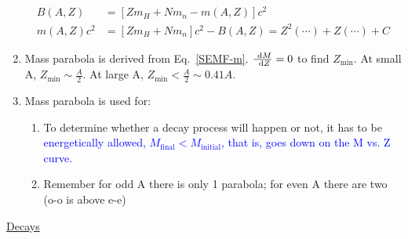\documentclass{school-22.101-notes}
\begin{document}
\begin{enumerate}
\begin{align}
B(A,Z) &= \left[ Z m_H + N m_n - m(A,Z) \right] c^2  \label{BAZ}\\
m(A,Z) c^2 &= \left[ Z m_H + N m_n \right] c^2 - B(A,Z) = Z^2 (\cdots) + Z(\cdots) + C \label{SEMF-m}
\end{align}
\item Mass parabola is derived from Eq.~\ref{SEMF-m}. $\frac{\mbox{ }\mathrm{d} M}{\mbox{ }\mathrm{d} Z} = 0$ to find $Z_{\mathrm{min}}$. At small A, $Z_{\mathrm{min}} \sim \frac{A}{2}$. At large A, $Z_{\mathrm{min}} < \frac{A}{2} \sim 0.41 A$. 
\item Mass parabola is used for: 
    \begin{enumerate}
    \item To determine whether a decay process will happen or not, it has to be \textcolor{blue}{energetically allowed, $M_{\mathrm{final}} < M_{\mathrm{initial}}$, that is, goes down on the M vs. Z curve.}
    \item Remember for odd A there is only 1 parabola; for even A there are two (o-o is above e-e)
    \end{enumerate}
\end{enumerate}

\clearpage
\uline{Decays}
\end{document}
